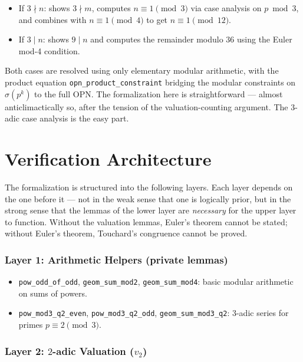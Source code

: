 \documentclass[11pt,a4paper]{article}
\begin{document}
\begin{itemize}
    \item If $3 \nmid n$: shows $3 \nmid m$, computes $n \equiv 1 \pmod{3}$ via case analysis on $p \bmod 3$, and combines with $n \equiv 1 \pmod{4}$ to get $n \equiv 1 \pmod{12}$.
    \item If $3 \mid n$: shows $9 \mid n$ and computes the remainder modulo $36$ using the Euler mod-4 condition.
\end{itemize}

Both cases are resolved using only elementary modular arithmetic, with the product equation \texttt{opn\_product\_constraint} bridging the modular constraints on $\sigma(p^k)$ to the full OPN. The formalization here is straightforward --- almost anticlimactically so, after the tension of the valuation-counting argument. The $3$-adic case analysis is the easy part.

\section{Verification Architecture}

The formalization is structured into the following layers. Each layer depends on the one before it --- not in the weak sense that one is logically prior, but in the strong sense that the lemmas of the lower layer are \emph{necessary} for the upper layer to function. Without the valuation lemmas, Euler's theorem cannot be stated; without Euler's theorem, Touchard's congruence cannot be proved.

\subsubsection{Layer 1: Arithmetic Helpers (private lemmas)}

\begin{itemize}
    \item \texttt{pow\_odd\_of\_odd}, \texttt{geom\_sum\_mod2}, \texttt{geom\_sum\_mod4}: basic modular arithmetic on sums of powers.
    \item \texttt{pow\_mod3\_q2\_even}, \texttt{pow\_mod3\_q2\_odd}, \texttt{geom\_sum\_mod3\_q2}: 3-adic series for primes $p \equiv 2 \pmod{3}$.
\end{itemize}

\subsubsection{Layer 2: $2$-adic Valuation ($v_2$)}
\end{document}
